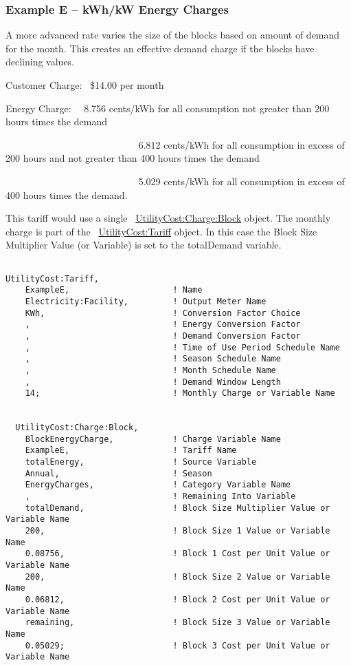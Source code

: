 \subsubsection{Example E -- kWh/kW Energy Charges}\label{example-e-kwhkw-energy-charges}

A more advanced rate varies the size of the blocks based on amount of demand for the month. This creates an effective demand charge if the blocks have declining values.

Customer Charge:~ \$14.00 per month

Energy Charge:~~ 8.756 cents/kWh for all consumption not greater than 200 hours times the demand

~~~~~~~~~~~~~~~~~~~~~~~~~~~ 6.812 cents/kWh for all consumption in excess of 200 hours and not greater than 400 hours times the demand

~~~~~~~~~~~~~~~~~~~~~~~~~~~ 5.029 cents/kWh for all consumption in excess of 400 hours times the demand.

This tariff would use a single ~\hyperref[utilitycostchargeblock]{UtilityCost:Charge:Block} object. The monthly charge is part of the ~\hyperref[utilitycosttariff]{UtilityCost:Tariff} object. In this case the Block Size Multiplier Value (or Variable) is set to the totalDemand variable.

\begin{lstlisting}

UtilityCost:Tariff,
    ExampleE,                     ! Name
    Electricity:Facility,         ! Output Meter Name
    KWh,                          ! Conversion Factor Choice
    ,                             ! Energy Conversion Factor
    ,                             ! Demand Conversion Factor
    ,                             ! Time of Use Period Schedule Name
    ,                             ! Season Schedule Name
    ,                             ! Month Schedule Name
    ,                             ! Demand Window Length
    14;                           ! Monthly Charge or Variable Name


  UtilityCost:Charge:Block,
    BlockEnergyCharge,            ! Charge Variable Name
    ExampleE,                     ! Tariff Name
    totalEnergy,                  ! Source Variable
    Annual,                       ! Season
    EnergyCharges,                ! Category Variable Name
    ,                             ! Remaining Into Variable
    totalDemand,                  ! Block Size Multiplier Value or Variable Name
    200,                          ! Block Size 1 Value or Variable Name
    0.08756,                      ! Block 1 Cost per Unit Value or Variable Name
    200,                          ! Block Size 2 Value or Variable Name
    0.06812,                      ! Block 2 Cost per Unit Value or Variable Name
    remaining,                    ! Block Size 3 Value or Variable Name
    0.05029;                      ! Block 3 Cost per Unit Value or Variable Name
\end{lstlisting}

